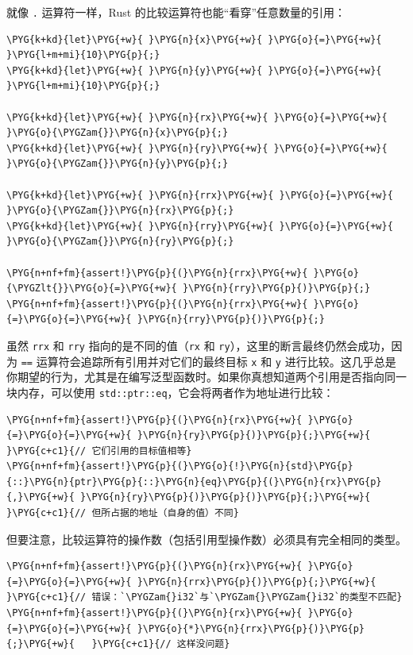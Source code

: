 就像 \texttt{.} 运算符一样，Rust 的比较运算符也能“看穿”任意数量的引用：

\begin{Verbatim}[commandchars=\\\{\},breaklines=true,breakanywhere=true,fontsize=\codefont,xleftmargin=17bp]
\PYG{k+kd}{let}\PYG{+w}{ }\PYG{n}{x}\PYG{+w}{ }\PYG{o}{=}\PYG{+w}{ }\PYG{l+m+mi}{10}\PYG{p}{;}
\PYG{k+kd}{let}\PYG{+w}{ }\PYG{n}{y}\PYG{+w}{ }\PYG{o}{=}\PYG{+w}{ }\PYG{l+m+mi}{10}\PYG{p}{;}

\PYG{k+kd}{let}\PYG{+w}{ }\PYG{n}{rx}\PYG{+w}{ }\PYG{o}{=}\PYG{+w}{ }\PYG{o}{\PYGZam{}}\PYG{n}{x}\PYG{p}{;}
\PYG{k+kd}{let}\PYG{+w}{ }\PYG{n}{ry}\PYG{+w}{ }\PYG{o}{=}\PYG{+w}{ }\PYG{o}{\PYGZam{}}\PYG{n}{y}\PYG{p}{;}

\PYG{k+kd}{let}\PYG{+w}{ }\PYG{n}{rrx}\PYG{+w}{ }\PYG{o}{=}\PYG{+w}{ }\PYG{o}{\PYGZam{}}\PYG{n}{rx}\PYG{p}{;}
\PYG{k+kd}{let}\PYG{+w}{ }\PYG{n}{rry}\PYG{+w}{ }\PYG{o}{=}\PYG{+w}{ }\PYG{o}{\PYGZam{}}\PYG{n}{ry}\PYG{p}{;}

\PYG{n+nf+fm}{assert!}\PYG{p}{(}\PYG{n}{rrx}\PYG{+w}{ }\PYG{o}{\PYGZlt{}}\PYG{o}{=}\PYG{+w}{ }\PYG{n}{rry}\PYG{p}{)}\PYG{p}{;}
\PYG{n+nf+fm}{assert!}\PYG{p}{(}\PYG{n}{rrx}\PYG{+w}{ }\PYG{o}{=}\PYG{o}{=}\PYG{+w}{ }\PYG{n}{rry}\PYG{p}{)}\PYG{p}{;}
\end{Verbatim}

虽然 \texttt{rrx} 和 \texttt{rry} 指向的是不同的值（\texttt{rx} 和 \texttt{ry}），这里的断言最终仍然会成功，因为 \texttt{==} 运算符会追踪所有引用并对它们的最终目标 \texttt{x} 和 \texttt{y} 进行比较。这几乎总是你期望的行为，尤其是在编写泛型函数时。如果你真想知道两个引用是否指向同一块内存，可以使用 \texttt{std::ptr::eq}，它会将两者作为地址进行比较：

\begin{Verbatim}[commandchars=\\\{\},breaklines=true,breakanywhere=true,fontsize=\codefont,xleftmargin=17bp]
\PYG{n+nf+fm}{assert!}\PYG{p}{(}\PYG{n}{rx}\PYG{+w}{ }\PYG{o}{=}\PYG{o}{=}\PYG{+w}{ }\PYG{n}{ry}\PYG{p}{)}\PYG{p}{;}\PYG{+w}{              }\PYG{c+c1}{// 它们引用的目标值相等}
\PYG{n+nf+fm}{assert!}\PYG{p}{(}\PYG{o}{!}\PYG{n}{std}\PYG{p}{::}\PYG{n}{ptr}\PYG{p}{::}\PYG{n}{eq}\PYG{p}{(}\PYG{n}{rx}\PYG{p}{,}\PYG{+w}{ }\PYG{n}{ry}\PYG{p}{)}\PYG{p}{)}\PYG{p}{;}\PYG{+w}{ }\PYG{c+c1}{// 但所占据的地址（自身的值）不同}
\end{Verbatim}

但要注意，比较运算符的操作数（包括引用型操作数）必须具有完全相同的类型。

\begin{Verbatim}[commandchars=\\\{\},breaklines=true,breakanywhere=true,fontsize=\codefont,xleftmargin=17bp]
\PYG{n+nf+fm}{assert!}\PYG{p}{(}\PYG{n}{rx}\PYG{+w}{ }\PYG{o}{=}\PYG{o}{=}\PYG{+w}{ }\PYG{n}{rrx}\PYG{p}{)}\PYG{p}{;}\PYG{+w}{    }\PYG{c+c1}{// 错误：`\PYGZam{}i32`与`\PYGZam{}\PYGZam{}i32`的类型不匹配}
\PYG{n+nf+fm}{assert!}\PYG{p}{(}\PYG{n}{rx}\PYG{+w}{ }\PYG{o}{=}\PYG{o}{=}\PYG{+w}{ }\PYG{o}{*}\PYG{n}{rrx}\PYG{p}{)}\PYG{p}{;}\PYG{+w}{   }\PYG{c+c1}{// 这样没问题}
\end{Verbatim}

